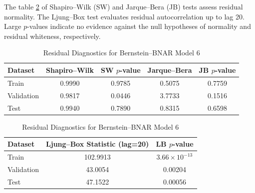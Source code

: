 \documentclass{article}
\begin{document}
The table \ref{tab:model6-residual_diagnostics} of Shapiro--Wilk (SW) and Jarque--Bera (JB) tests assess residual normality. The Ljung--Box test evaluates residual autocorrelation up to lag 20. Large $p$-values indicate no evidence against the null hypotheses of normality and residual whiteness, respectively.
\begin{table}[htbp]
\centering
\caption{Residual Diagnostics for Bernstein--BNAR Model 6}
\label{tab:model6-residual_diagnostics}

\begin{tabular}{lcccc}
\hline
\textbf{Dataset} 
& \textbf{Shapiro--Wilk} 
& \textbf{SW $p$-value} 
& \textbf{Jarque--Bera} 
& \textbf{JB $p$-value} \\
\hline
Train       & 0.9990 & 0.9785 & 0.5075 & 0.7759 \\
Validation  & 0.9817 & 0.0446 & 3.7733 & 0.1516 \\
Test        & 0.9940 & 0.7890 & 0.8315 & 0.6598 \\
\hline
\end{tabular}

\vspace{0.6em}

\begin{tabular}{lcc}
\hline
\textbf{Dataset} 
& \textbf{Ljung--Box Statistic (lag=20)} 
& \textbf{LB $p$-value} \\
\hline
Train       & 102.9913 & $3.66 \times 10^{-13}$ \\
Validation  & 43.0054  & 0.00204 \\
Test        & 47.1522  & 0.00056 \\
\hline
\end{tabular}

\vspace{0.6em}
\end{table}
\end{document}
